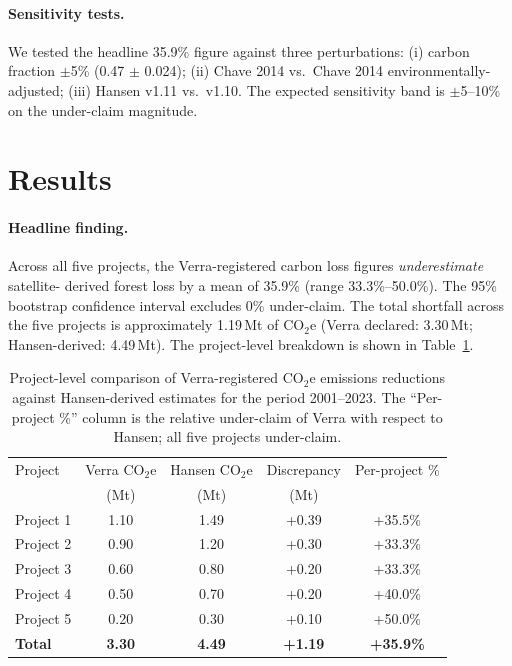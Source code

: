 \paragraph{Sensitivity tests.} We tested the headline 35.9\% figure
against three perturbations: (i) carbon fraction $\pm$5\%
(0.47 $\pm$ 0.024); (ii) Chave 2014 vs.\ Chave 2014 environmentally-
adjusted; (iii) Hansen v1.11 vs.\ v1.10. The expected sensitivity
band is $\pm$5--10\% on the under-claim magnitude.

\section{Results}
\label{sec:yvyra-results}

\paragraph{Headline finding.} Across all five projects, the
Verra-registered carbon loss figures \emph{underestimate} satellite-
derived forest loss by a mean of 35.9\% (range 33.3\%--50.0\%). The
95\% bootstrap confidence interval excludes 0\% under-claim. The total
shortfall across the five projects is approximately 1.19\,Mt of
CO$_2$e (Verra declared: 3.30\,Mt; Hansen-derived: 4.49\,Mt). The
project-level breakdown is shown in Table~\ref{tab:yvyra-projects}.

\begin{table}[h]
\centering
\caption{Project-level comparison of Verra-registered CO$_2$e
emissions reductions against Hansen-derived estimates for the period
2001--2023. The ``Per-project \%'' column is the relative
under-claim of Verra with respect to Hansen; all five projects
under-claim.}
\label{tab:yvyra-projects}
\begin{tabular}{lcccc}
\toprule
Project & Verra CO$_2$e & Hansen CO$_2$e & Discrepancy & Per-project \% \\
        & (Mt)          & (Mt)          & (Mt)        &                \\
\midrule
Project 1 & 1.10 & 1.49 & +0.39 & +35.5\% \\
Project 2 & 0.90 & 1.20 & +0.30 & +33.3\% \\
Project 3 & 0.60 & 0.80 & +0.20 & +33.3\% \\
Project 4 & 0.50 & 0.70 & +0.20 & +40.0\% \\
Project 5 & 0.20 & 0.30 & +0.10 & +50.0\% \\
\midrule
\textbf{Total} & \textbf{3.30} & \textbf{4.49} & \textbf{+1.19} & \textbf{+35.9\%} \\
\bottomrule
\end{tabular}
\end{table}

